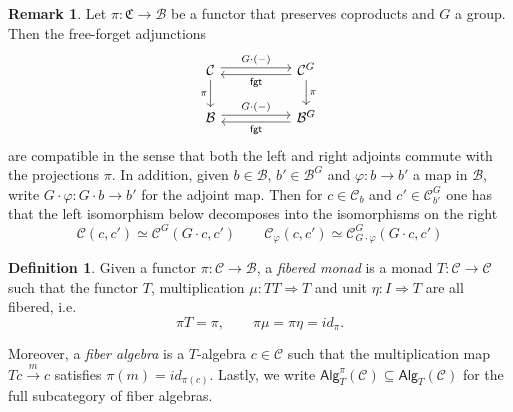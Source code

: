 \documentclass[a4paper,10pt
,draft
]{article}%
\numberwithin{equation}{section}
\numberwithin{figure}{section}
\theoremstyle{definition} %
\newtheorem{definition}[equation]{Definition}%
\newtheorem{remark}[equation]{Remark}%
\newcommand{\C}{\ensuremath{\mathcal C}}
\newcommand{\1}{\ensuremath{\mathbbm 1}}%
\begin{document}
\begin{remark}
Let $\pi \colon \mathfrak{C} \to \mathcal{B}$
be a functor that preserves coproducts and $G$ a group.
Then the free-forget adjunctions 
\begin{equation}
\begin{tikzcd}[column sep =50pt]
	\mathcal{C}
	\arrow[shift left]{r}{G \cdot (-)}
	\arrow[d, "\pi"']
&
	\mathcal{C}^G 
	\arrow[shift left]{l}{\mathsf{fgt}}
	\arrow[d, "\pi"]
\\
	\mathcal{B} 
	\arrow[shift left]{r}{G \cdot (-)}
&
	\mathcal{B}^G
	\arrow[shift left]{l}{\mathsf{fgt}}
\end{tikzcd}
\end{equation}
are compatible in the sense that both the left and right adjoints commute with the projections $\pi$.
In addition, given $b \in \mathcal{B}$, $b' \in \mathcal{B}^G$
and $\varphi \colon b \to b'$ a map in $\mathcal{B}$, write
$G\cdot \varphi \colon G\cdot b \to b'$
for the adjoint map.
Then for $c \in \mathcal{C}_b$ and $c' \in \mathcal{C}^G_{b'}$
one has that the left isomorphism below decomposes
into the isomorphisms on the right
\begin{equation}\label{ADJOVADJ EQ}
\C(c,c') 
\simeq 
\C^G(G \cdot c,c')\qquad
\C_{\varphi}(c,c') 
\simeq 
\C^G_{G\cdot\varphi}(G \cdot c,c')
\end{equation}
\end{remark}




\begin{definition}\label{FIBMON DEF}
Given a functor $\pi \colon \mathcal{C} \to \mathcal{B}$,
a \textit{fibered monad} is a monad $T \colon \mathcal{C} \to \mathcal{C}$ such that 
the functor $T$,
multiplication 
$\mu \colon TT \Rightarrow T$
and unit $\eta \colon I \Rightarrow T$
are all fibered, i.e.
\[
\pi T = \pi,\qquad
\pi\mu=\pi\eta=id_{\pi}.
\]

Moreover, a \textit{fiber algebra} is a $T$-algebra $c \in \mathcal{C}$
such that the multiplication map
$Tc \xrightarrow{m} c$ satisfies 
$\pi(m)=id_{\pi(c)}$.
%
Lastly, we write $\mathsf{Alg}^{\pi}_T(\mathcal{C}) \subseteq \mathsf{Alg}_T(\mathcal{C})$ for the full subcategory of fiber algebras.
\end{definition}
\end{document}
